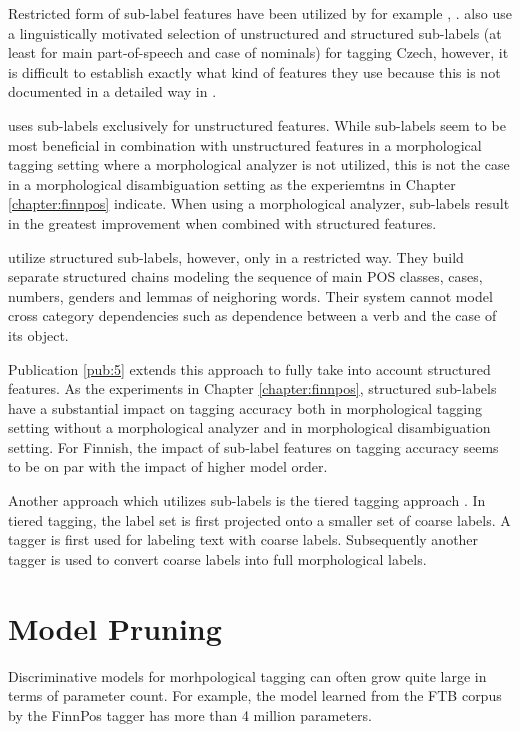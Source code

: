 Restricted form of sub-label features have been utilized by for
example \cite{Muller2013}, \cite{Smith2005}. \cite{Spoustova2009} also
use a linguistically motivated selection of unstructured and
structured sub-labels (at least for main part-of-speech and case of
nominals) for tagging Czech, however, it is difficult to establish
exactly what kind of features they use because this is not documented
in a detailed way in \cite{Spoustatova2009}.
 
\cite{Muller2013} uses sub-labels exclusively for unstructured
features. While sub-labels seem to be most beneficial in combination
with unstructured features in a morphological tagging setting where a
morphological analyzer is not utilized, this is not the case in a
morphological disambiguation setting as the experiemtns in Chapter
\ref{chapter:finnpos} indicate. When using a morphological analyzer,
sub-labels result in the greatest improvement when combined with
structured features.

\cite{Smith2015} utilize structured sub-labels, however, only in a
restricted way. They build separate structured chains modeling the
sequence of main POS classes, cases, numbers, genders and lemmas of
neighoring words. Their system cannot model cross category
dependencies such as dependence between a verb and the case of its
object.

Publication \ref{pub:5} extends this approach to fully take
into account structured features. As the experiments in Chapter
\ref{chapter:finnpos}, structured sub-labels have a substantial impact
on tagging accuracy both in morphological tagging setting without a
morphological analyzer and in morphological disambiguation
setting. For Finnish, the impact of sub-label features on tagging
accuracy seems to be on par with the impact of higher model order.

Another approach which utilizes sub-labels is the tiered tagging
approach \citep{Tufis1999,Ceausu2006}. In tiered tagging, the label
set is first projected onto a smaller set of coarse labels. A tagger
is first used for labeling text with coarse labels. Subsequently
another tagger is used to convert coarse labels into full
morphological labels.

\section{Model Pruning}\label{sec:pruning}

Discriminative models for morhpological tagging can often grow quite
large in terms of parameter count. For example, the model learned from
the FTB corpus by the FinnPos tagger has more than 4 million
parameters.

